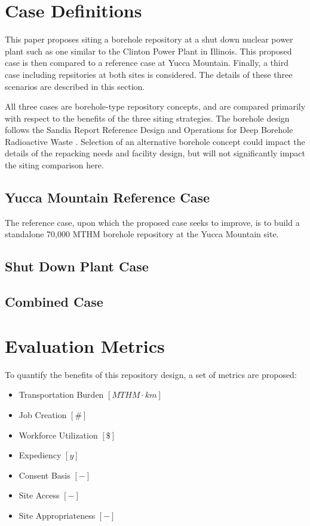 
\section{Case Definitions}

This paper proposes siting a borehole
 repository at a shut down nuclear power plant such as one similar to the 
 Clinton Power Plant in Illinois. This proposed case is then compared to a 
 reference case at Yucca Mountain. Finally, a third case including repsitories 
 at both sites is considered.  The details of these three scenarios are described in this section.

 All three cases are borehole-type repository concepts, and are compared 
 primarily with respect to the benefits of the three siting strategies.
The borehole design follows the Sandia Report Reference Design and Operations 
for Deep Borehole Radioactive Waste \cite{arnold_reference_2011}. Selection of 
an alternative borehole concept could impact the details of the repacking needs 
and facility design, but will not significantly impact the siting comparison 
here.
 
\subsection{Yucca Mountain Reference Case} 
The reference case, upon which the proposed case seeks to improve, is to build 
a standalone 70,000 \gls{MTHM} borehole repository at the Yucca Mountain site.
   


\subsection{Shut Down Plant Case}


\subsection{Combined Case}

\section{Evaluation Metrics}

To quantify the benefits of this repository design, a set of metrics are 
proposed:

\begin{itemize}
        \item Transportation Burden $[MTHM \cdot km]$
        \item Job Creation $[\#]$
        \item Workforce Utilization $[\$]$ 
        \item Expediency $[y]$
        \item Consent Basis $[-]$
        \item Site Access $[-]$
        \item Site Appropriateness $[-]$
\end{itemize}

